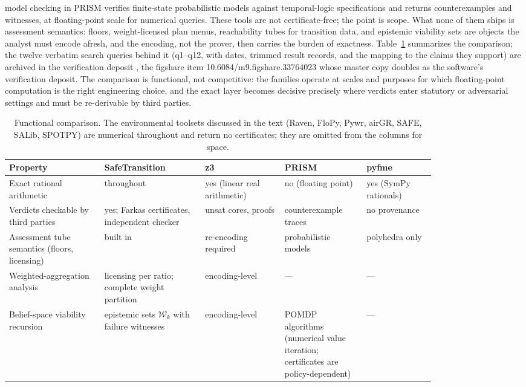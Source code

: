 \documentclass[3p,11pt]{elsarticle}
\begin{document}
model checking in PRISM \citep{Kwiatkowska2011} verifies finite-state
probabilistic models against temporal-logic specifications and returns
counterexamples and witnesses, at floating-point scale for numerical
queries. These tools are not certificate-free; the point is scope. What
none of them ships is
assessment semantics: floors, weight-licensed plan menus, reachability tubes
for transition data, and epistemic viability sets are objects the analyst
must encode afresh, and the encoding, not the prover, then carries the
burden of exactness. Table~\ref{tab:compare} summarizes the comparison; the
twelve verbatim search queries behind it (q1--q12, with dates,
trimmed result records, and the mapping to the claims they support) are
archived in the verification deposit \citep{Deposit2026}, the figshare
item 10.6084/m9.figshare.33764023 whose master copy doubles as the
software's verification deposit. The comparison is functional, not
competitive: the families operate at scales and purposes for which
floating-point computation is the right engineering choice, and the exact
layer becomes decisive precisely where verdicts enter statutory or
adversarial settings and must be re-derivable by third parties.

\begin{table}[t]
\centering
\small
\setlength{\tabcolsep}{3pt}
\begin{tabular}{@{}p{0.185\linewidth}p{0.19\linewidth}p{0.155\linewidth}p{0.15\linewidth}p{0.135\linewidth}@{}}
\toprule
Property & SafeTransition & z3 & PRISM & pyfme \\
\midrule
Exact rational arithmetic & throughout & yes (linear real arithmetic) & no (floating point) & yes (SymPy rationals) \\
Verdicts checkable by third parties & yes; Farkas certificates, independent checker & unsat cores, proofs & counterexample traces & no provenance \\
Assessment tube semantics (floors, licensing) & built in & re-encoding required & probabilistic models & polyhedra only \\
Weighted-aggregation analysis & licensing per ratio; complete weight partition & encoding-level & --- & --- \\
Belief-space viability recursion & epistemic sets $\mathcal{W}_k$ with failure witnesses & encoding-level & POMDP algorithms (numerical value iteration; certificates are policy-dependent) & --- \\
\bottomrule
\end{tabular}
\caption{Functional comparison. The environmental toolsets discussed in the
text (Raven, FloPy, Pywr, airGR, SAFE, SALib, SPOTPY) are numerical
throughout and return no certificates; they are omitted from the columns
for space.}
\label{tab:compare}
\end{table}
\end{document}
